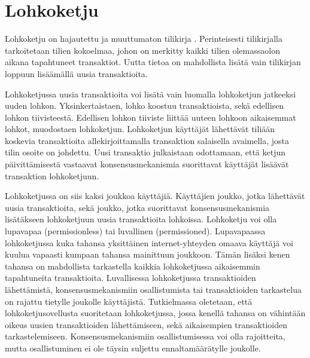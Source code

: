 
\section{Lohkoketju}

Lohkoketju on hajautettu ja muuttumaton tilikirja \cite{8760539}. Perinteisesti tilikirjalla tarkoitetaan tilien kokoelmaa, johon on merkitty kaikki tilien olemassaolon aikana tapahtuneet transaktiot. Uutta tietoa on mahdollista lisätä vain tilikirjan loppuun lisäämällä uusia transaktioita.

Lohkoketjussa uusia transaktioita voi lisätä vain luomalla lohkoketjun jatkeeksi uuden lohkon. Yksinkertaistaen, lohko koostuu transaktioista, sekä edellisen lohkon tiivisteestä. Edellisen lohkon tiiviste liittää uuteen lohkoon aikaisemmat lohkot, muodostaen lohkoketjun. Lohkoketjun käyttäjät lähettävät tiliään koskevia transaktioita allekirjoittamalla transaktion salaisella avaimella, josta tilin osoite on johdettu. Uusi transaktio julkaistaan odottamaan, että ketjun päivittämisestä vastaavat konsensusmekanismia suorittavat käyttäjät lisäävät transaktion lohkoketjuun. 

Lohkoketjussa on siis kaksi joukkoa käyttäjiä. Käyttäjien joukko, jotka lähettävät uusia transaktioita, sekä joukko, jotka suorittavat konsensusmekanismia lisätäkseen lohkoketjuun uusia transaktioita lohkoissa. Lohkoketju voi olla lupavapaa (permissionless) tai luvallinen (permissioned). Lupavapaassa lohkoketjussa kuka tahansa yksittäinen internet-yhteyden omaava käyttäjä voi kuulua vapaasti kumpaan tahansa mainittuun joukkoon. Tämän lisäksi kenen tahansa on mahdollista tarkastella kaikkia lohkoketjussa aikaisemmin tapahtuneita transaktioita. Luvallisessa lohkoketjussa transaktioiden lähettämistä, konsensusmekanismiin osallistumista tai transaktioiden tarkastelua on rajattu tietylle joukolle käyttäjistä. Tutkielmassa oletetaan, että lohkoketjusovellusta suoritetaan lohkoketjussa, jossa kenellä tahansa on vähintään oikeus uusien transaktioiden lähettämiseen, sekä aikaisempien transaktioiden tarkastelemiseen. Konsensusmekanismiin osallistumisessa voi olla rajoitteita, mutta osallistuminen ei ole täysin suljettu ennaltamäärätylle joukolle.

